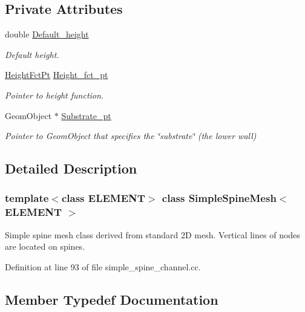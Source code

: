 \subsection*{Private Attributes}
\begin{DoxyCompactItemize}
\item 
double \hyperlink{classSimpleSpineMesh_a7a6d3f655da48ed9d18f6ca8e29f6576}{Default\+\_\+height}
\begin{DoxyCompactList}\small\item\em Default height. \end{DoxyCompactList}\item 
\hyperlink{classSimpleSpineMesh_a671d96f0143dfeb7aaba8af56c0c0620}{Height\+Fct\+Pt} \hyperlink{classSimpleSpineMesh_ac0509d0d0868d37ef87834b39d2a084b}{Height\+\_\+fct\+\_\+pt}
\begin{DoxyCompactList}\small\item\em Pointer to height function. \end{DoxyCompactList}\item 
Geom\+Object $\ast$ \hyperlink{classSimpleSpineMesh_a9031e27d5855e029312d356f6a38da76}{Substrate\+\_\+pt}
\begin{DoxyCompactList}\small\item\em Pointer to Geom\+Object that specifies the \char`\"{}substrate\char`\"{} (the lower wall) \end{DoxyCompactList}\end{DoxyCompactItemize}


\subsection{Detailed Description}
\subsubsection*{template$<$class E\+L\+E\+M\+E\+NT$>$\newline
class Simple\+Spine\+Mesh$<$ E\+L\+E\+M\+E\+N\+T $>$}

Simple spine mesh class derived from standard 2D mesh. Vertical lines of nodes are located on spines. 

Definition at line 93 of file simple\+\_\+spine\+\_\+channel.\+cc.



\subsection{Member Typedef Documentation}
\mbox{\label{classSimpleSpineMesh_a671d96f0143dfeb7aaba8af56c0c0620}} 
